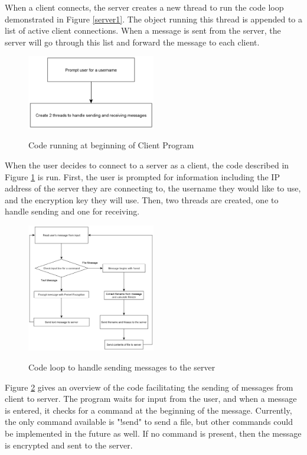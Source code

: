 \documentclass{article}
\begin{document}
When a client connects, the server creates a new thread to run the code loop demonstrated in Figure \ref{server1}. The object running this thread is appended to a list of active client connections. When a message is sent from the server, the server will go through this list and forward the message to each client.

\begin{figure}[h]
\caption{Code running at beginning of Client Program}
\centering
\includegraphics[width=0.5\textwidth]{media/clientFlowchart2.png}
\label{client2}
\end{figure}

When the user decides to connect to a server as a client, the code described in Figure \ref{client2} is run. First, the user is prompted for information including the IP address of the server they are connecting to, the username they would like to use, and the encryption key they will use. Then, two threads are created, one to handle sending and one for receiving.

\begin{figure}[h]
\caption{Code loop to handle sending messages to the server}
\centering
\includegraphics[width=0.5\textwidth]{media/clientFlowchart1.png}
\label{client1}
\end{figure}

Figure \ref{client1} gives an overview of the code facilitating the sending of messages from client to server. The program waits for input from the user, and when a message is entered, it checks for a command at the beginning of the message. Currently, the only command available is "!send" to send a file, but other commands could be implemented in the future as well. If no command is present, then the message is encrypted and sent to the server.
\end{document}
